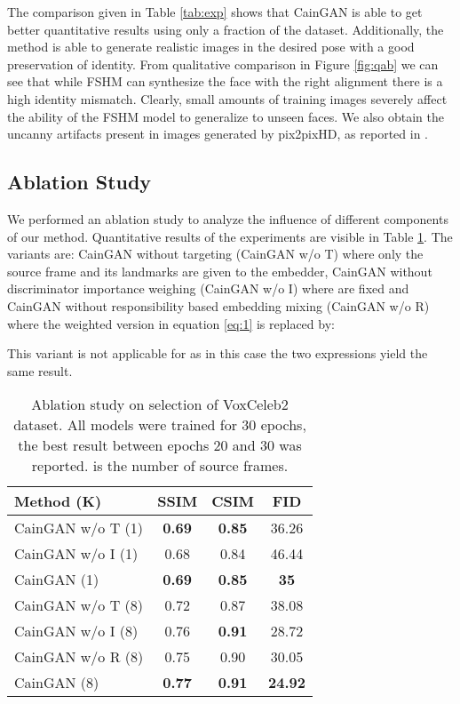 \documentclass[11pt,a4paper]{article}
\begin{document}
The comparison given in Table \ref{tab:exp} shows that CainGAN is able to get better quantitative results using only a fraction of the dataset. Additionally, the method is able to generate realistic images in the desired pose with a good preservation of identity. From qualitative comparison in Figure \ref{fig:qab} we can see that while FSHM can synthesize the face with the right alignment there is a high identity mismatch. Clearly, small amounts of training images severely affect the ability of the FSHM model to generalize to unseen faces. We also obtain the uncanny artifacts present in images generated by pix2pixHD, as reported in \cite{zakharov2019fewshot}.

\subsection{Ablation Study}
We performed an ablation study to analyze the influence of different components of our method. Quantitative results of the experiments are visible in Table \ref{tab:abl}. The variants are: CainGAN without targeting (CainGAN w/o T) where only the source frame and its landmarks are given to the embedder, CainGAN without discriminator importance weighing (CainGAN w/o I) where  are fixed and CainGAN without responsibility based embedding mixing (CainGAN w/o R) where the weighted version in equation \eqref{eq:1} is replaced by:

This variant is not applicable for  as in this case the two expressions yield the same result.

\setlength{\tabcolsep}{1em}
\begin{table}[!t]
\centering
\begin{tabular}{l c c c}
     Method (K) & SSIM  & CSIM  & FID  \\
     \hline
     CainGAN w/o T (1) & \textbf{0.69} & \textbf{0.85} & 36.26 \\ 
     CainGAN w/o I (1) & 0.68 & 0.84 & 46.44 \\
     CainGAN (1) & \textbf{0.69} & \textbf{0.85} & \textbf{35} \\
     \hline
     CainGAN w/o T (8) & 0.72 & 0.87 & 38.08 \\ 
     CainGAN w/o I (8) & 0.76 & \textbf{0.91} & 28.72 \\
     CainGAN w/o R (8) & 0.75 & 0.90 & 30.05 \\
     CainGAN (8) & \textbf{0.77} & \textbf{0.91} & \textbf{24.92} \\
     \hline
\end{tabular}
\caption{Ablation study on selection of VoxCeleb2 dataset. All models were trained for 30 epochs, the best result between epochs 20 and 30 was reported.  is the number of source frames.}
\label{tab:abl}
\end{table}
\end{document}
